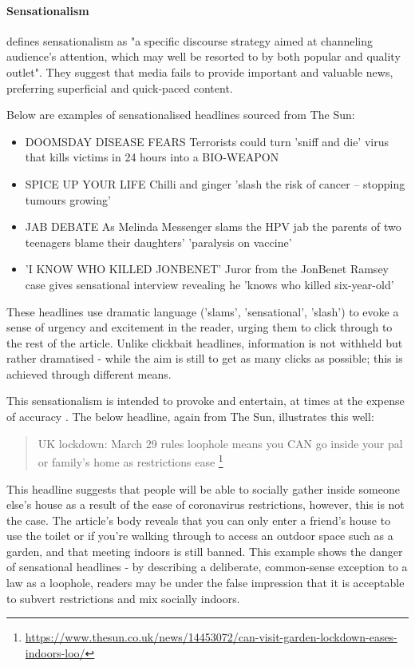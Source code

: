 \paragraph{Sensationalism}
 defines sensationalism as "a specific discourse strategy aimed at channeling audience's attention,  which may well be  resorted to by both popular and quality outlet". They suggest that media fails to provide important and valuable news, preferring superficial and quick-paced content.

Below are examples of sensationalised headlines sourced from The Sun:

\begin{itemize}
	\item DOOMSDAY DISEASE FEARS Terrorists could turn 'sniff and die' virus that kills victims in 24 hours into a BIO-WEAPON
	\item SPICE UP YOUR LIFE Chilli and ginger 'slash the risk of cancer – stopping tumours growing'
	\item JAB DEBATE As Melinda Messenger slams the HPV jab the parents of two teenagers blame their daughters' 'paralysis on vaccine'
	\item 'I KNOW WHO KILLED JONBENET' Juror from the JonBenet Ramsey case gives sensational interview revealing he 'knows who killed six-year-old'
	
\end{itemize}

These headlines use dramatic language ('slams', 'sensational', 'slash') to evoke a sense of urgency and excitement in the reader, urging them to click through to the rest of the article. Unlike clickbait headlines, information is not withheld but rather dramatised - while the aim is still to get as many clicks as possible; this is achieved through different means.

This sensationalism is intended to provoke and entertain, at times at the expense of accuracy \cite{chesney2017}. The below headline, again from The Sun, illustrates this well:

\begin{quote}
UK lockdown: March 29 rules loophole means you CAN go inside your pal or family’s home as restrictions ease \footnote{\url{https://www.thesun.co.uk/news/14453072/can-visit-garden-lockdown-eases-indoors-loo/}}
\end{quote}

This headline suggests that people will be able to socially gather inside someone else's house as a result of the ease of coronavirus restrictions, however, this is not the case. The article's body reveals that you can only enter a friend's house to use the toilet or if you're walking through to access an outdoor space such as a garden, and that meeting indoors is still banned.
 This example shows the danger of sensational headlines - by describing a deliberate, common-sense exception to a law as a loophole, readers may be under the false impression that it is acceptable to subvert restrictions and mix socially indoors.



